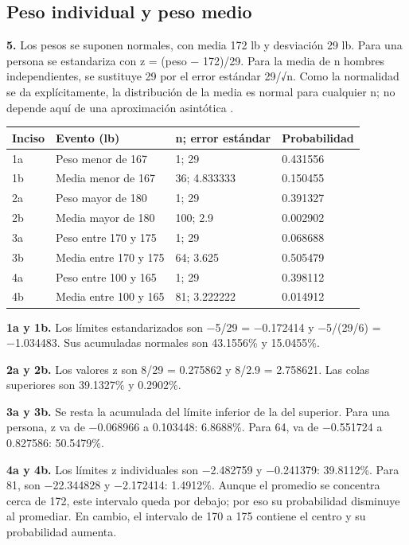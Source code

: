 {\clearpage
\subsection{Peso individual y peso medio}
\textbf{5.} Los pesos se suponen normales, con media 172 lb y desviación 29 lb. Para una persona se estandariza con z = (peso − 172)/29. Para la media de n hombres independientes, se sustituye 29 por el error estándar 29/√n. Como la normalidad se da explícitamente, la distribución de la media es normal para cualquier n; no depende aquí de una aproximación asintótica \citep{holmesBusiness2023}.

\begin{center}
\begin{tabular}{llll}
\textbf{Inciso} & \textbf{Evento (lb)} & \textbf{n; error estándar} & \textbf{Probabilidad}\\\hline
1a & Peso menor de 167 & 1; 29 & 0.431556\\
1b & Media menor de 167 & 36; 4.833333 & 0.150455\\
2a & Peso mayor de 180 & 1; 29 & 0.391327\\
2b & Media mayor de 180 & 100; 2.9 & 0.002902\\
3a & Peso entre 170 y 175 & 1; 29 & 0.068688\\
3b & Media entre 170 y 175 & 64; 3.625 & 0.505479\\
4a & Peso entre 100 y 165 & 1; 29 & 0.398112\\
4b & Media entre 100 y 165 & 81; 3.222222 & 0.014912\\
\end{tabular}
\end{center}

\textbf{1a y 1b.} Los límites estandarizados son −5/29 = −0.172414 y −5/(29/6) = −1.034483. Sus acumuladas normales son 43.1556\% y 15.0455\%.

\textbf{2a y 2b.} Los valores z son 8/29 = 0.275862 y 8/2.9 = 2.758621. Las colas superiores son 39.1327\% y 0.2902\%.

\textbf{3a y 3b.} Se resta la acumulada del límite inferior de la del superior. Para una persona, z va de −0.068966 a 0.103448: 6.8688\%. Para 64, va de −0.551724 a 0.827586: 50.5479\%.

\textbf{4a y 4b.} Los límites z individuales son −2.482759 y −0.241379: 39.8112\%. Para 81, son −22.344828 y −2.172414: 1.4912\%. Aunque el promedio se concentra cerca de 172, este intervalo queda por debajo; por eso su probabilidad disminuye al promediar. En cambio, el intervalo de 170 a 175 contiene el centro y su probabilidad aumenta.

}
